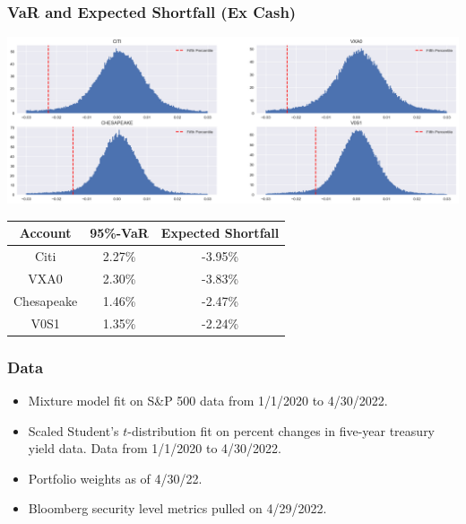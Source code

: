 \documentclass{beamer}
\begin{document}
\begin{frame}
\frametitle{VaR and Expected Shortfall (Ex Cash)}
\begin{center}
\includegraphics[scale = 0.25]{monte_carlo_port.png}

\begin{tabular}{| c | c c |}
\hline
Account	&	95\%-VaR	&	Expected Shortfall\\\hline
Citi		&	2.27\%	&          -3.95\% \\
VXA0		&	2.30\%	&          -3.83\%	\\
Chesapeake	&	1.46\%	&          -2.47\%	\\
V0S1		&	1.35\%	&          -2.24\%\\\hline
\end{tabular}

\end{center}

\end{frame}

\begin{frame}
\frametitle{Data}
\begin{itemize}
\item Mixture model fit on S\&P 500 data from 1/1/2020 to 4/30/2022.
\item Scaled Student's $t$-distribution fit on percent changes in five-year treasury yield data. Data from 1/1/2020 to 4/30/2022.
\item Portfolio weights as of 4/30/22.
\item Bloomberg security level metrics pulled on 4/29/2022.
\end{itemize}


\end{frame}
\end{document}
